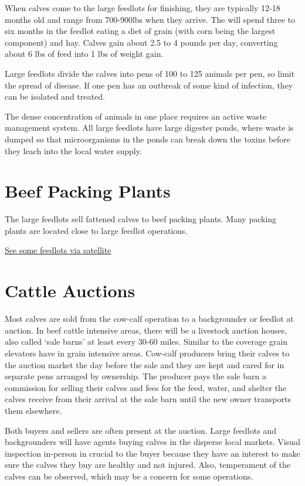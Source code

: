 \documentclass[
]{book}
\begin{document}
When calves come to the large feedlots for finishing, they are typically 12-18 months old and range from 700-900lbs when they arrive. The will spend three to six months in the feedlot eating a diet of grain (with corn being the largest component) and hay. Calves gain about 2.5 to 4 pounds per day, converting about 6 lbs of feed into 1 lbs of weight gain.

Large feedlots divide the calves into pens of 100 to 125 animals per pen, so limit the spread of disease. If one pen has an outbreak of some kind of infection, they can be isolated and treated.

The dense concentration of animals in one place requires an active waste management system. All large feedlots have large digester ponds, where waste is dumped so that microorganisms in the ponds can break down the toxins before they leach into the local water supply.

\hypertarget{beef-packing-plants}{%
\section{Beef Packing Plants}\label{beef-packing-plants}}

The large feedlots sell fattened calves to beef packing plants. Many packing plants are located close to large feedlot operations.

\href{http://maps.google.com}{See some feedlots via satellite}

\hypertarget{cattle-auctions}{%
\section{Cattle Auctions}\label{cattle-auctions}}

Most calves are sold from the cow-calf operation to a backgrounder or feedlot at auction. In beef cattle intensive areas, there will be a livestock auction houses, also called `sale barns' at least every 30-60 miles. Similar to the coverage grain elevators have in grain intensive areas. Cow-calf producers bring their calves to the auction market the day before the sale and they are kept and cared for in separate pens arranged by ownership. The producer pays the sale barn a commission for selling their calves and fees for the feed, water, and shelter the calves receive from their arrival at the sale barn until the new owner transports them elsewhere.

Both buyers and sellers are often present at the auction. Large feedlots and backgrounders will have agents buying calves in the disperse local markets. Visual inspection in-person in crucial to the buyer because they have an interest to make sure the calves they buy are healthy and not injured. Also, temperament of the calves can be observed, which may be a concern for some operations.
\end{document}
